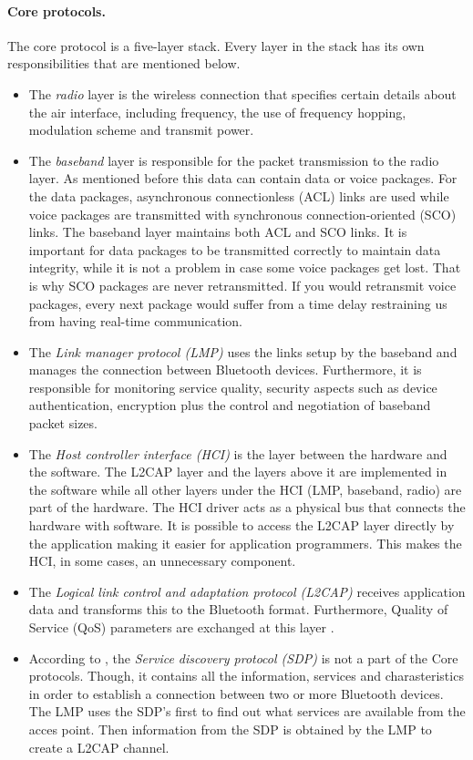 \documentclass[a4paper, 11pt]{report}
\begin{document}
		\paragraph{Core protocols.}
The core protocol is a five-layer stack. Every layer in the stack has its own responsibilities that are mentioned below.

		\begin{itemize}
			\item The \textit{radio} layer is the wireless connection that specifies certain details about the air interface, including frequency, the use of frequency hopping, modulation scheme and transmit power. 
			\item The \textit{baseband} layer is responsible for the packet transmission to the radio layer. As mentioned before this data can contain data or voice packages. For the data packages, asynchronous connectionless (ACL) links are used while voice packages are transmitted with synchronous connection-oriented (SCO) links. The baseband layer maintains both ACL and SCO links. It is important for data packages to be transmitted correctly to maintain data integrity, while it is not a problem in case some voice packages get lost. That is why SCO packages are never retransmitted. If you would retransmit voice packages, every next package would suffer from a time delay restraining us from having real-time communication.
			\item The \textit{Link manager protocol (LMP)} uses the links setup by the baseband and manages the connection between Bluetooth devices. Furthermore, it is responsible for monitoring service quality, security aspects such as device authentication, encryption plus the control and negotiation of baseband packet sizes.
			\item The \textit{Host controller interface (HCI)} is the layer between the hardware and the software. The L2CAP layer and the layers above it are implemented in the software while all other layers under the HCI (LMP, baseband, radio) are part of the hardware. The HCI driver acts as a physical bus that connects the hardware with software. It is possible to access the L2CAP layer directly by the application making it easier for application programmers. This makes the HCI, in some cases, an unnecessary component.
			\item The \textit{Logical link control and adaptation protocol (L2CAP)} receives application data and transforms this to the Bluetooth format. Furthermore, Quality of Service (QoS) parameters are exchanged at this layer \cite{bluetoothStack}.
			\item According to \cite{bluetoothStack}, the \textit{Service discovery protocol (SDP)} is not a part of the Core protocols. Though, it contains all the information, services and charasteristics  in order to establish a connection between two or more Bluetooth devices. The LMP uses the SDP's first to find out what services are available from the acces point. Then information from the SDP is obtained by the LMP to create a L2CAP channel.
		\end{itemize}
		
\end{document}
